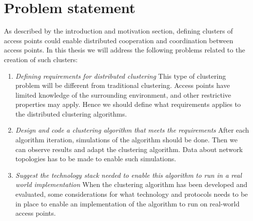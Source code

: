 \section{Problem statement}
As described by the introduction and motivation section, defining clusters of access points could enable distributed
cooperation and coordination between access points. In this thesis we will address the following problems related to the creation of such clusters:
\begin{enumerate}
	\item	\textit{Defining requirements for distributed clustering}\newline
		This type of clustering problem will be different from traditional clustering. Access points have
		limited knowledge of the surrounding environment, and other restrictive properties may apply. Hence
		we should define what requirements applies to the distributed clustering algorithms.

	\item \textit{Design and code a clustering algorithm that meets the requirements}\newline
		After each algorithm iteration, simulations of the algorithm should be done. Then we can observe results and adapt the clustering algorithm.
		Data about network topologies has to be made to enable such simulations.
		
	\item \textit{Suggest the technology stack needed to enable this algorithm to run in a real world implementation }\newline
		When the clustering algorithm has been developed and evaluated, some considerations for what technology and protocols needs to be in place to enable
		an implementation of the algorithm to run on real-world access points. 
\end{enumerate}

